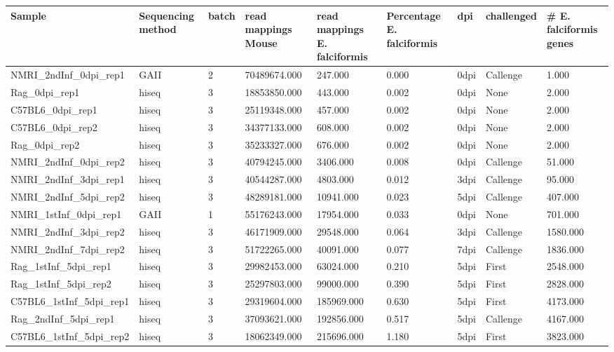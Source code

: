 \begin{table}[ht]
\centering
\begin{tabular}{lllllllll}
  \hline
Sample & Sequencing method & batch & read mappings Mouse & read mappings E. falciformis & Percentage E. falciformis & dpi & challenged & \# E. falciformis genes \\ 
  \hline
NMRI\_2ndInf\_0dpi\_rep1 & GAII & 2 & 70489674.000 & 247.000 & 0.000 & 0dpi & Callenge & 1.000 \\ 
  Rag\_0dpi\_rep1 & hiseq & 3 & 18853850.000 & 443.000 & 0.002 & 0dpi & None & 2.000 \\ 
  C57BL6\_0dpi\_rep1 & hiseq & 3 & 25119348.000 & 457.000 & 0.002 & 0dpi & None & 2.000 \\ 
  C57BL6\_0dpi\_rep2 & hiseq & 3 & 34377133.000 & 608.000 & 0.002 & 0dpi & None & 2.000 \\ 
  Rag\_0dpi\_rep2 & hiseq & 3 & 35233327.000 & 676.000 & 0.002 & 0dpi & None & 2.000 \\ 
  NMRI\_2ndInf\_0dpi\_rep2 & hiseq & 3 & 40794245.000 & 3406.000 & 0.008 & 0dpi & Callenge & 51.000 \\ 
  NMRI\_2ndInf\_3dpi\_rep1 & hiseq & 3 & 40544287.000 & 4803.000 & 0.012 & 3dpi & Callenge & 95.000 \\ 
  NMRI\_2ndInf\_5dpi\_rep2 & hiseq & 3 & 48289181.000 & 10941.000 & 0.023 & 5dpi & Callenge & 407.000 \\ 
  NMRI\_1stInf\_0dpi\_rep1 & GAII & 1 & 55176243.000 & 17954.000 & 0.033 & 0dpi & None & 701.000 \\ 
  NMRI\_2ndInf\_3dpi\_rep2 & hiseq & 3 & 46171909.000 & 29548.000 & 0.064 & 3dpi & Callenge & 1580.000 \\ 
  NMRI\_2ndInf\_7dpi\_rep2 & hiseq & 3 & 51722265.000 & 40091.000 & 0.077 & 7dpi & Callenge & 1836.000 \\ 
  Rag\_1stInf\_5dpi\_rep1 & hiseq & 3 & 29982453.000 & 63024.000 & 0.210 & 5dpi & First & 2548.000 \\ 
  Rag\_1stInf\_5dpi\_rep2 & hiseq & 3 & 25297803.000 & 99000.000 & 0.390 & 5dpi & First & 2828.000 \\ 
  C57BL6\_1stInf\_5dpi\_rep1 & hiseq & 3 & 29319604.000 & 185969.000 & 0.630 & 5dpi & First & 4173.000 \\ 
  Rag\_2ndInf\_5dpi\_rep1 & hiseq & 3 & 37093621.000 & 192856.000 & 0.517 & 5dpi & Callenge & 4167.000 \\ 
  C57BL6\_1stInf\_5dpi\_rep2 & hiseq & 3 & 18062349.000 & 215696.000 & 1.180 & 5dpi & First & 3823.000 \\ 

\end{tabular}
\end{table}
